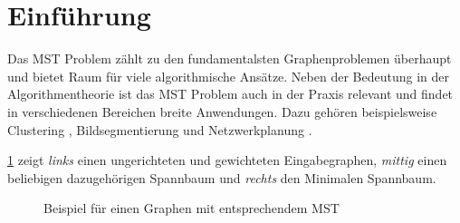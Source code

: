 \section{Einführung}\label{Einführung}
Das MST Problem zählt zu den fundamentalsten Graphenproblemen überhaupt und bietet Raum für viele algorithmische Ansätze.
Neben der Bedeutung in der Algorithmentheorie ist das MST Problem auch in der Praxis relevant und findet in verschiedenen Bereichen breite Anwendungen. Dazu gehören beispielsweise Clustering \cite{bateni2017affinity}, Bildsegmentierung \cite{wassenberg2009efficient} und Netzwerkplanung \cite{li2011mst}.

\cref{BasicMST-Img} zeigt \textit{links} einen ungerichteten und gewichteten Eingabegraphen, \textit{mittig} einen beliebigen dazugehörigen Spannbaum und \textit{rechts} den Minimalen Spannbaum.

\begin{figure}[H]
    \centering
    
    \caption{Beispiel für einen Graphen mit entsprechendem MST}
    \label{BasicMST-Img}
\end{figure}

